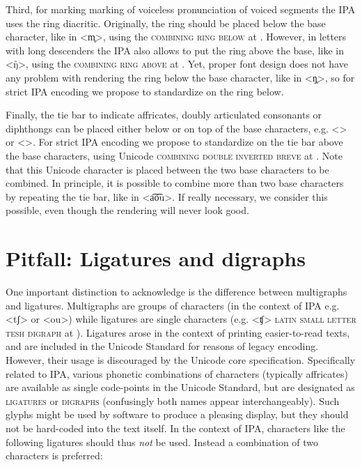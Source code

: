 Third, for marking marking of voiceless pronunciation of voiced segments the IPA
uses the ring diacritic. Originally, the ring should be placed below the 
base character, like in <m̥>, using the \textsc{combining ring below} at . 
However, in letters with long descenders the IPA also allows to put the ring 
above the base, like in <ŋ̊>, using the \textsc{combining ring above} at 
. Yet, proper font design does not have any problem with rendering 
the ring below the base character, like in <ŋ̥>, so for strict IPA encoding we 
propose to standardize on the ring below.
 
Finally, the tie bar to indicate affricates, doubly articulated consonants or
diphthongs can be placed either below or on top of the base characters, e.g.
<> or <>. For strict IPA encoding we propose to standardize on the tie bar
above the base characters, using Unicode \textsc{combining double inverted
breve} at . Note that this Unicode character is placed between the two 
base characters to be combined. In principle, it is possible to combine more 
than two base characters by repeating the tie bar, like in <a͡o͡u>. If really
necessary, we consider this possible, even though the rendering will never look 
good.

\section{Pitfall: Ligatures and digraphs}
\label{pitfall-ligatures-digraphs}     

One important distinction to acknowledge is the difference between multigraphs
and ligatures. Multigraphs are groups of characters (in the context of IPA e.g.
<tʃ> or <ou>) while ligatures are single characters (e.g. <ʧ> \textsc{latin
small letter tesh digraph} at ). Ligatures arose in the context of
printing easier-to-read texts, and are included in the Unicode Standard for
reasons of legacy encoding. However, their usage is discouraged by the Unicode
core specification. Specifically related to IPA, various phonetic combinations
of characters (typically affricates) are available as single code-points in the
Unicode Standard, but are designated as \textsc{ligatures} or \textsc{digraphs}
(confusingly both names appear interchangeably). Such glyphs might be used by
software to produce a pleasing display, but they should not be hard-coded into
the text itself. In the context of IPA, characters like the following ligatures
should thus \emph{not} be used. Instead a combination of two characters is
preferred:
      
